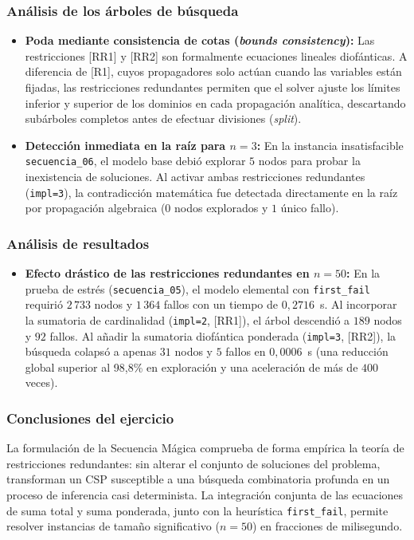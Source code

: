 \subsubsection{Análisis de los árboles de búsqueda}
\begin{itemize}
    \item \textbf{Poda mediante consistencia de cotas (\textit{bounds consistency}):} Las restricciones [RR1] y [RR2] son formalmente ecuaciones lineales diofánticas. A diferencia de [R1], cuyos propagadores solo actúan cuando las variables están fijadas, las restricciones redundantes permiten que el solver ajuste los límites inferior y superior de los dominios en cada propagación analítica, descartando subárboles completos antes de efectuar divisiones (\textit{split}).
    \item \textbf{Detección inmediata en la raíz para $n=3$:} En la instancia insatisfacible \texttt{secuencia\_06}, el modelo base debió explorar $5$ nodos para probar la inexistencia de soluciones. Al activar ambas restricciones redundantes (\texttt{impl=3}), la contradicción matemática fue detectada directamente en la raíz por propagación algebraica ($0$ nodos explorados y $1$ único fallo).
\end{itemize}

\subsubsection{Análisis de resultados}
\begin{itemize}
    \item \textbf{Efecto drástico de las restricciones redundantes en $n=50$:} En la prueba de estrés (\texttt{secuencia\_05}), el modelo elemental con \texttt{first\_fail} requirió $2\,733$ nodos y $1\,364$ fallos con un tiempo de $0,2716$~s. Al incorporar la sumatoria de cardinalidad (\texttt{impl=2}, [RR1]), el árbol descendió a $189$ nodos y $92$ fallos. Al añadir la sumatoria diofántica ponderada (\texttt{impl=3}, [RR2]), la búsqueda colapsó a apenas $31$ nodos y $5$ fallos en $0,0006$~s (una reducción global superior al 98,8\% en exploración y una aceleración de más de $400$ veces).
\end{itemize}

\subsubsection{Conclusiones del ejercicio}
La formulación de la Secuencia Mágica comprueba de forma empírica la teoría de restricciones redundantes: sin alterar el conjunto de soluciones del problema, transforman un CSP susceptible a una búsqueda combinatoria profunda en un proceso de inferencia casi determinista. La integración conjunta de las ecuaciones de suma total y suma ponderada, junto con la heurística \texttt{first\_fail}, permite resolver instancias de tamaño significativo ($n = 50$) en fracciones de milisegundo.
